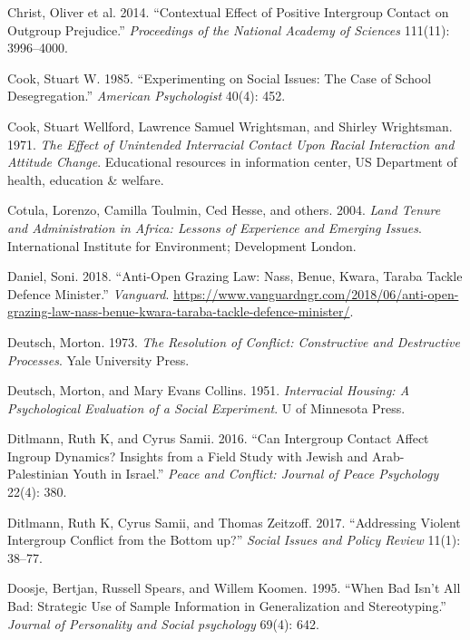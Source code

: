 \documentclass[11pt]{article}
\begin{document}
\leavevmode\hypertarget{ref-christ2014contextual}{}%
Christ, Oliver et al. 2014. ``Contextual Effect of Positive Intergroup
Contact on Outgroup Prejudice.'' \emph{Proceedings of the National
Academy of Sciences} 111(11): 3996--4000.

\leavevmode\hypertarget{ref-cook1985experimenting}{}%
Cook, Stuart W. 1985. ``Experimenting on Social Issues: The Case of
School Desegregation.'' \emph{American Psychologist} 40(4): 452.

\leavevmode\hypertarget{ref-cook1971race}{}%
Cook, Stuart Wellford, Lawrence Samuel Wrightsman, and Shirley
Wrightsman. 1971. \emph{The Effect of Unintended Interracial Contact
Upon Racial Interaction and Attitude Change}. Educational resources in
information center, US Department of health, education \& welfare.

\leavevmode\hypertarget{ref-cotula2004land}{}%
Cotula, Lorenzo, Camilla Toulmin, Ced Hesse, and others. 2004.
\emph{Land Tenure and Administration in Africa: Lessons of Experience
and Emerging Issues}. International Institute for Environment;
Development London.

\leavevmode\hypertarget{ref-daniel2018anti}{}%
Daniel, Soni. 2018. ``Anti-Open Grazing Law: Nass, Benue, Kwara, Taraba
Tackle Defence Minister.'' \emph{Vanguard}.
\url{https://www.vanguardngr.com/2018/06/anti-open-grazing-law-nass-benue-kwara-taraba-tackle-defence-minister/}.

\leavevmode\hypertarget{ref-deutsch1973resolution}{}%
Deutsch, Morton. 1973. \emph{The Resolution of Conflict: Constructive
and Destructive Processes}. Yale University Press.

\leavevmode\hypertarget{ref-deutsch1951interracial}{}%
Deutsch, Morton, and Mary Evans Collins. 1951. \emph{Interracial
Housing: A Psychological Evaluation of a Social Experiment}. U of
Minnesota Press.

\leavevmode\hypertarget{ref-ditlmann2016can}{}%
Ditlmann, Ruth K, and Cyrus Samii. 2016. ``Can Intergroup Contact Affect
Ingroup Dynamics? Insights from a Field Study with Jewish and
Arab-Palestinian Youth in Israel.'' \emph{Peace and Conflict: Journal of
Peace Psychology} 22(4): 380.

\leavevmode\hypertarget{ref-ditlmann2017addressing}{}%
Ditlmann, Ruth K, Cyrus Samii, and Thomas Zeitzoff. 2017. ``Addressing
Violent Intergroup Conflict from the Bottom up?'' \emph{Social Issues
and Policy Review} 11(1): 38--77.

\leavevmode\hypertarget{ref-doosje1995bad}{}%
Doosje, Bertjan, Russell Spears, and Willem Koomen. 1995. ``When Bad
Isn't All Bad: Strategic Use of Sample Information in Generalization and
Stereotyping.'' \emph{Journal of Personality and Social psychology}
69(4): 642.
\end{document}
